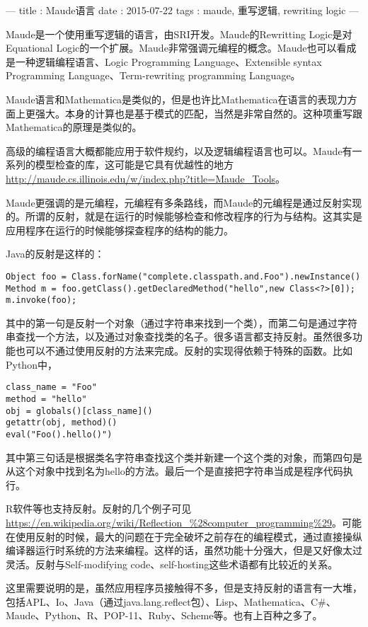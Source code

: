---
title : Maude语言
date  : 2015-07-22
tags  : maude, 重写逻辑, rewriting logic
---

Maude是一个使用重写逻辑的语言，由SRI开发。Maude的Rewritting Logic是对Equational Logic的一个扩展。Maude非常强调元编程的概念。Maude也可以看成是一种逻辑编程语言、Logic Programming Language、Extensible syntax Programming Language、Term-rewriting programming Language。

Maude语言和Mathematica是类似的，但是也许比Mathematica在语言的表现力方面上更强大。本身的计算也是基于模式的匹配，当然是非常自然的。这种项重写跟Mathematica的原理是类似的。

高级的编程语言大概都能应用于软件规约，以及逻辑编程语言也可以。Maude有一系列的模型检查的库，这可能是它具有优越性的地方\url{http://maude.cs.illinois.edu/w/index.php?title=Maude_Tools}。

Maude更强调的是元编程，元编程有多条路线，而Maude的元编程是通过反射实现的。所谓的反射，就是在运行的时候能够检查和修改程序的行为与结构。这其实是应用程序在运行的时候能够探查程序的结构的能力。

Java的反射是这样的：

\begin{verbatim}
Object foo = Class.forName("complete.classpath.and.Foo").newInstance()
Method m = foo.getClass().getDeclaredMethod("hello",new Class<?>[0]);
m.invoke(foo);
\end{verbatim}

其中的第一句是反射一个对象（通过字符串来找到一个类），而第二句是通过字符串查找一个方法，以及通过对象查找类的名子。很多语言都支持反射。虽然很多功能也可以不通过使用反射的方法来完成。反射的实现得依赖于特殊的函数。比如Python中，

\begin{verbatim}
class_name = "Foo"
method = "hello"
obj = globals()[class_name]()
getattr(obj, method)()
eval("Foo().hello()")
\end{verbatim}

其中第三句话是根据类名字符串查找这个类并新建一个这个类的对象，而第四句是从这个对象中找到名为hello的方法。最后一个是直接把字符串当成是程序代码执行。

R软件等也支持反射。反射的几个例子可见\url{https://en.wikipedia.org/wiki/Reflection_%28computer_programming%29}。可能在使用反射的时候，最大的问题在于完全破坏之前存在的编程模式，通过直接操纵编译器运行时系统的方法来编程。这样的话，虽然功能十分强大，但是又好像太过灵活。反射与Self-modifying code、self-hosting这些术语都有比较近的关系。

这里需要说明的是，虽然应用程序员接触得不多，但是支持反射的语言有一大堆，包括APL、Io、Java（通过java.lang.reflect包）、Lisp、Mathematica、C\#、Maude、Python、R、POP-11、Ruby、Scheme等。也有上百种之多了。
